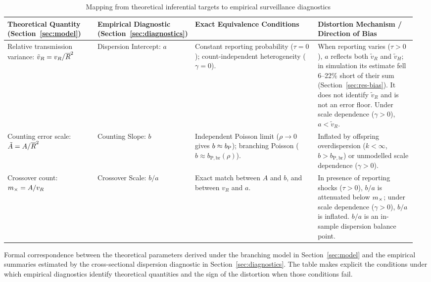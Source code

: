 \begin{table}[!tbp]
\centering
\linespread{1.2}\small
\caption{Mapping from theoretical inferential targets to empirical surveillance diagnostics}
\label{tab:rosetta}
\begin{tabularx}{\linewidth}{@{}p{0.22\linewidth}p{0.20\linewidth}p{0.30\linewidth}p{0.24\linewidth}@{}}
\toprule
Theoretical Quantity (Section~\ref{sec:model}) & Empirical Diagnostic (Section~\ref{sec:diagnostics}) & Exact Equivalence Conditions & Distortion Mechanism / Direction of Bias \\
\midrule
Relative transmission variance: $\tilde v_R = v_R / \overline{R}^2$ & Dispersion Intercept: $a$ & Constant reporting probability ($\tau = 0$); count-independent heterogeneity ($\gamma = 0$). & When reporting varies ($\tau > 0$), $a$ reflects both $\tilde v_R$ and $\tilde v_H$; in simulation its estimate fell 6--22\% short of their sum (Section~\ref{sec:res-bias}). It does not identify $\tilde v_R$ and is not an error floor. Under scale dependence ($\gamma > 0$), $a < \tilde v_R$. \\
\addlinespace[3pt]
Counting error scale: $\tilde A = A / \overline{R}^2$ & Counting Slope: $b$ & Independent Poisson limit ($\rho \to 0$ gives $b \approx b_{\mathrm P}$); branching Poisson ($b \approx b_{\mathrm{P,br}}(\rho)$). & Inflated by offspring overdispersion ($k < \infty$, $b > b_{\mathrm{P,br}}$) or unmodelled scale dependence ($\gamma > 0$). \\
\addlinespace[3pt]
Crossover count: $m_\times = A / v_R$ & Crossover Scale: $b/a$ & Exact match between $A$ and $b$, and between $v_R$ and $a$. & In presence of reporting shocks ($\tau > 0$), $b/a$ is attenuated below $m_\times$; under scale dependence ($\gamma > 0$), $b/a$ is inflated. $b/a$ is an in-sample dispersion balance point. \\
\bottomrule
\end{tabularx}
\par\smallskip
\begin{minipage}{\linewidth}\footnotesize\raggedright Formal correspondence between the theoretical parameters derived under the branching model in Section~\ref{sec:model} and the empirical summaries estimated by the cross-sectional dispersion diagnostic in Section~\ref{sec:diagnostics}. The table makes explicit the conditions under which empirical diagnostics identify theoretical quantities and the sign of the distortion when those conditions fail.\end{minipage}
\end{table}
